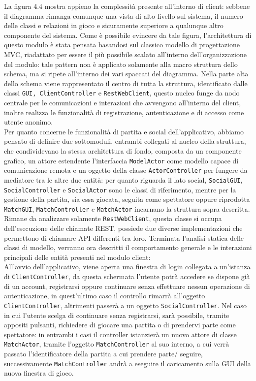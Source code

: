      La figura 4.4 mostra appieno la complessità presente all'interno di client: sebbene il diagramma rimanga comunque una vista di alto livello sul sistema, il numero delle classi e relazioni in gioco e sicuramente superiore a qualunque altro componente del sistema.
     Come è possibile evincere da tale figura, l'architettura di questo modulo è stata pensata basandosi sul classico modello di progettazione MVC, riadattato per essere il più possibile scalato all'interno dell'organizzazione del modulo: tale pattern non è applicato solamente alla macro struttura dello schema, ma si ripete all'interno dei vari spaccati del diagramma.
     Nella parte alta dello schema viene rappresentato il centro di tutta la struttura, identificato dalle classi \texttt{GUI, ClientController} e \texttt{RestWebClient}, questo nucleo funge da nodo centrale per le comunicazioni e interazioni che avvengono all'interno del client, inoltre realizza le funzionalità di registrazione, autenticazione e di accesso come utente anonimo.\\
     Per quanto concerne le funzionalità di partita e social dell'applicativo, abbiamo pensato di definire due sottomoduli, entrambi collegati al nucleo della struttura, che condividevano la stessa architettura di fondo, composta da un componente grafico, un attore estendente l'interfaccia \texttt{ModelActor} come modello capace di comunicazione remota e un oggetto della classe \texttt{ActorController} per fungere da mediatore tra le altre due entità: per quanto riguarda il lato social, \texttt{SocialGUI}, \texttt{SocialController} e \texttt{SocialActor} sono le classi di riferimento, mentre per la gestione della partita, sia essa giocata, seguita come spettatore oppure riprodotta \texttt{MatchGUI}, \texttt{MatchController} e \texttt{MatchActor} incarnano la struttura sopra descritta.\\
     Rimane da analizzare solamente \texttt{RestWebClient}, questa classe si occupa dell'esecuzione delle chiamate REST, possiede due diverse implementazioni che permettono di chiamare API differenti tra loro.
     Terminata l'analisi statica delle classi di modello, verranno ora descritti il comportamento generale e le interazioni principali delle entità presenti nel modulo client:\\
     All'avvio dell'applicativo, viene aperta una finestra di login collegata a un'istanza di \texttt{ClientController}, da questa schermata l'utente potrà accedere se dispone già di un account, registrarsi oppure continuare senza effettuare nessun operazione di autenticazione, in quest'ultimo caso il controllo rimarrà all'oggetto \texttt{ClientController}, altrimenti passerà a un oggetto \texttt{SocialController}. Nel caso in cui l'utente scelga di continuare senza registrarsi, sarà possibile, tramite appositi pulsanti, richiedere di giocare una partita o di prendervi parte come spettatore: in entrambi i casi il controller istanzierà un nuovo attore di classe \texttt{MatchActor}, tramite l'oggetto \texttt{MatchController} al suo interno, a cui verrà passato l'identificatore della partita a cui prendere parte/ seguire, successivamente \texttt{MatchController} andrà a eseguire il caricamento sulla GUI della nuova finestra di gioco.
